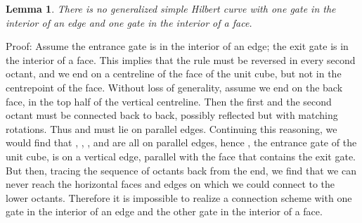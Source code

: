 \documentclass[11pt,a4paper]{article}
\newtheorem{lemma}{Lemma}
\newenvironment{proof}{Proof:}{\qed}
\def\squareforqed{\hbox{\rlap{}}}
\def\qed{\ifmmode\squareforqed\else{\unskip\nobreak\hfil
\penalty50\hskip1em\null\nobreak\hfil\squareforqed
\parfillskip=0pt\finalhyphendemerits=0\endgraf}\fi}
\begin{document}
\begin{lemma}\label{lem:edge-face-gates}
There is no generalized simple Hilbert curve with one gate in the interior of an edge and one gate in the interior of a face.
\end{lemma}
\begin{proof}
Assume the entrance gate is in the interior of an edge; the exit gate is in the interior of a face. This implies that the rule must be reversed in every second octant, and we end on a centreline of the face of the unit cube, but not in the centrepoint of the face. Without loss of generality, assume we end on the back face, in the top half of the vertical centreline. Then the first and the second octant must be connected back to back, possibly reflected but with matching rotations. Thus  and  must lie on parallel edges. Continuing this reasoning, we would find that , , ,  and  are all on parallel edges, hence , the entrance gate of the unit cube, is on a vertical edge, parallel with the face that contains the exit gate. But then, tracing the sequence of octants back from the end, we find that we can never reach the horizontal faces and edges on which we could connect to the lower octants. Therefore it is impossible to realize a connection scheme with one gate in the interior of an edge and the other gate in the interior of a face.
\end{proof}
\end{document}
